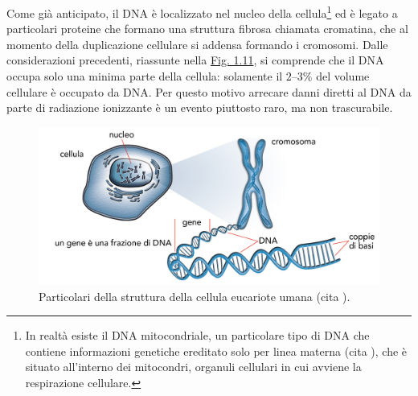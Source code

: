 \documentclass[12pt,a4paper,twoside]{report}
\begin{document}
	Come già anticipato, il DNA è localizzato nel nucleo della cellula\footnote{In realtà esiste il DNA mitocondriale, un particolare tipo di DNA che contiene informazioni genetiche ereditato solo per linea materna (cita
	), che è situato all'interno dei mitocondri, organuli cellulari in cui avviene la respirazione cellulare.} ed è legato a particolari proteine che formano una struttura fibrosa chiamata cromatina, che al momento della duplicazione cellulare si addensa formando i cromosomi. Dalle considerazioni precedenti, riassunte nella \hyperref[fig:cell]{Fig. 1.11}, si comprende che il DNA occupa solo una minima parte della cellula: solamente il $2$--$3\%$ del volume cellulare è occupato da DNA. Per questo motivo arrecare danni diretti al DNA da parte di radiazione ionizzante è un evento piuttosto raro, ma non trascurabile.
	\begin{figure}[H]
		\centering
		\includegraphics[width=0.9\linewidth]{images/cell.jpg}
		\caption{Particolari della struttura della cellula eucariote umana (cita
			).}
		\label{fig:cell}
	\end{figure}
	
\end{document}
